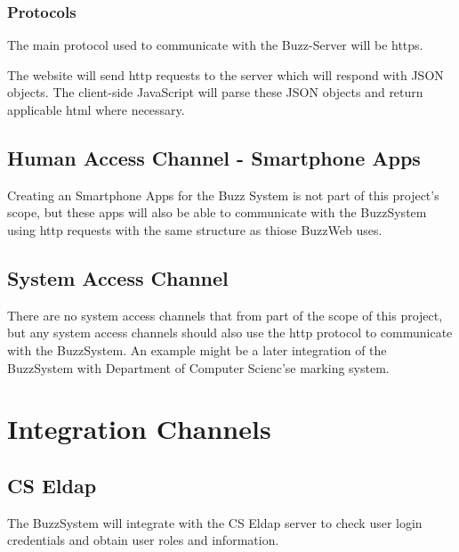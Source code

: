 	\subsubsection{Protocols}
	The main protocol used to communicate with the Buzz-Server will be https. 
	
	The website will send http requests to the server which will respond with JSON objects. The client-side JavaScript will parse these JSON objects and return applicable html where necessary. 
	

\subsection{Human Access Channel - Smartphone Apps}
Creating an Smartphone Apps for the Buzz System is not part of this project's scope, but these apps will also be able to communicate with the BuzzSystem using http requests with the same structure as thiose BuzzWeb uses.

\subsection{System Access Channel}
There are no system access channels that from part of the scope of this project, but any system access channels should also use the http protocol to communicate with the BuzzSystem. An example might be a later integration of the BuzzSystem with Department of Computer Scienc'se marking system.

\section{Integration Channels}
\subsection{CS Eldap}
The BuzzSystem will integrate with the CS Eldap server to check user login credentials and obtain user roles and information. 